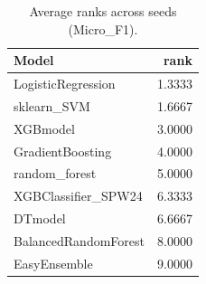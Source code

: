 \begin{table}[t]
\centering
\begin{tabular}{lr}
\toprule
Model & rank \\
\midrule
LogisticRegression & 1.3333 \\
sklearn_SVM & 1.6667 \\
XGBmodel & 3.0000 \\
GradientBoosting & 4.0000 \\
random_forest & 5.0000 \\
XGBClassifier_SPW24 & 6.3333 \\
DTmodel & 6.6667 \\
BalancedRandomForest & 8.0000 \\
EasyEnsemble & 9.0000 \\
\bottomrule
\end{tabular}
\caption{Average ranks across seeds (Micro_F1).}
\label{tab:avg_rank_Micro_F1}
\end{table}